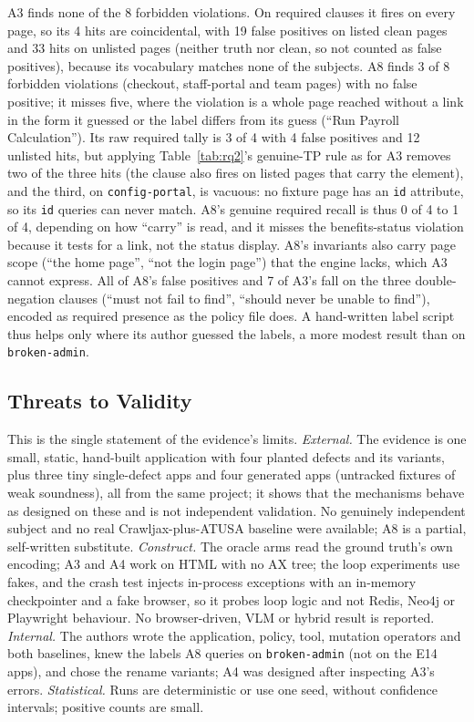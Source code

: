 A3 finds none of the 8 forbidden violations. On required clauses it fires on every
page, so its 4 hits are coincidental, with 19 false positives on listed clean pages
and 33 hits on unlisted pages (neither truth nor clean, so not counted as false
positives), because its vocabulary matches none of the subjects. A8 finds 3 of 8
forbidden violations (checkout, staff-portal and team pages) with no false positive;
it misses five, where the violation is a whole page reached without a link in the
form it guessed or the label differs from its guess (``Run Payroll Calculation'').
Its raw required tally is 3 of 4 with 4 false positives and 12 unlisted hits, but
applying Table~\ref{tab:rq2}'s genuine-TP rule as for A3 removes two of the three
hits (the clause also fires on listed pages that carry the element), and the third,
on \texttt{config-portal}, is vacuous: no fixture page has an \texttt{id} attribute,
so its \texttt{id} queries can never match. A8's genuine required recall is thus 0 of
4 to 1 of 4, depending on how ``carry'' is read, and it misses the benefits-status
violation because it tests for a link, not the status display. A8's invariants also
carry page scope (``the home page'', ``not the login page'') that the engine lacks,
which A3 cannot express. All of A8's false positives and 7 of A3's fall on the three
double-negation clauses (``must not fail to find'', ``should never be unable to
find''), encoded as required presence as the policy file does. A hand-written label
script thus helps only where its author guessed the labels, a more modest result
than on \texttt{broken-admin}.

\subsection{Threats to Validity}
\label{sec:threats}

This is the single statement of the evidence's limits. \emph{External.} The
evidence is one small, static, hand-built application with four planted defects
and its variants, plus three tiny single-defect apps and four generated apps (untracked fixtures of weak soundness), all from the same project; it
shows that the mechanisms behave as designed on these and is not independent
validation. No genuinely independent subject and no real Crawljax-plus-ATUSA
baseline were available; A8 is a partial, self-written substitute.
\emph{Construct.} The oracle arms read the ground truth's own encoding; A3 and A4
work on HTML with no AX tree; the loop experiments use fakes, and the crash test
injects in-process exceptions with an in-memory checkpointer and a fake browser,
so it probes loop logic and not Redis, Neo4j or Playwright behaviour. No
browser-driven, VLM or hybrid result is reported. \emph{Internal.} The authors
wrote the application, policy, tool, mutation operators and both baselines, knew
the labels A8 queries on \texttt{broken-admin} (not on the E14 apps), and chose the rename variants; A4 was designed after
inspecting A3's errors. \emph{Statistical.} Runs are deterministic or use one seed, without
confidence intervals; positive counts are small.
